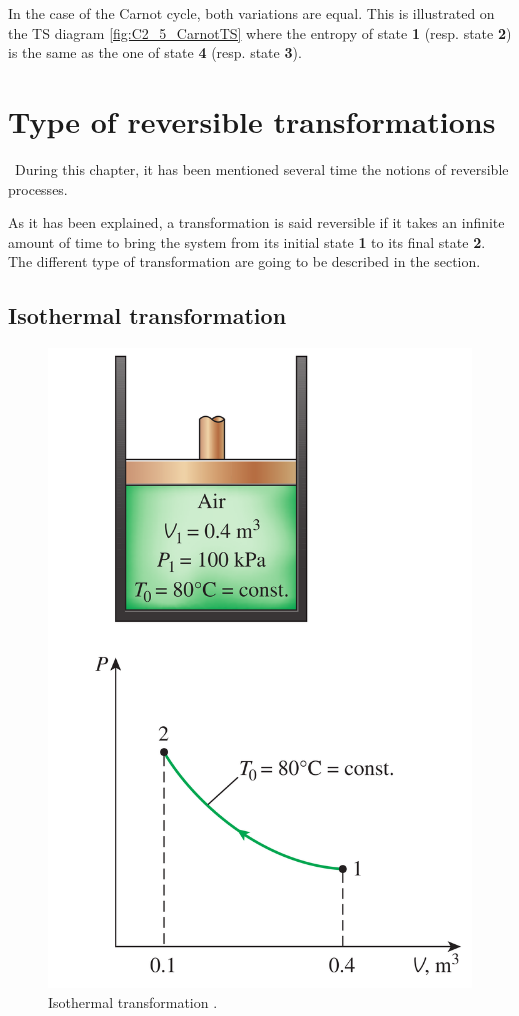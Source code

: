 In the case of the Carnot cycle, both variations are equal. This is illustrated on the TS diagram \ref{fig:C2_5_CarnotTS} where the entropy of state \textbf{1} (resp. state \textbf{2}) is the same as the one of state \textbf{4} (resp. state \textbf{3}).

\section{Type of reversible transformations}
\quad\ During this chapter, it has been mentioned several time the notions of reversible processes. 

As it has been explained, a transformation is said reversible if it takes an infinite amount of time to bring the system from its initial state \textbf{1} to its final state \textbf{2}. The different type of transformation are going to be described in the section.

\subsection{Isothermal transformation}
\begin{figure}
  \centering
  \includegraphics{isoT.png}
  \caption{Isothermal transformation \cite{2015}.}
  \label{fig:C2_5_isoT}
  \end{figure}

